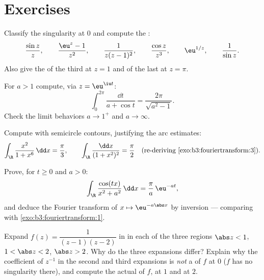 \section{Exercises}

\begin{exercise}[$\star$]\label{exo:b3:residues:1}
Classify the singularity at $0$ and compute the :
\[
\frac{\sin z}{z},\qquad
\frac{\eu^z - 1}{z^2},\qquad
\frac{1}{z(z-1)^2},\qquad
\frac{\cos z}{z^3},\qquad
\eu^{1/z},\qquad
\frac1{\sin z} .
\]
Also give the  of the third at $z = 1$ and of the last
at $z = \pi$.
\end{exercise}

\begin{exercise}[$\star$]\label{exo:b3:residues:2}
For $a > 1$ compute, via $z = \eu^{\iu t}$:
\[
\int_0^{2\pi}\frac{\dd t}{a + \cos t}
= \frac{2\pi}{\sqrt{a^2 - 1}} .
\]
Check the limit behaviors $a \to 1^+$ and $a \to \infty$.
\end{exercise}

\begin{exercise}[$\star\star$]\label{exo:b3:residues:3}
Compute with semicircle contours, justifying the arc estimates:
\[
\int_\R\frac{x^2}{1 + x^6}\,\dd x = \frac\pi3,
\qquad
\int_\R\frac{\dd x}{(1 + x^2)^{2}} = \frac\pi2
\quad\text{(re-deriving \cref{exo:b3:fouriertransform:3})}.
\]
\end{exercise}

\begin{exercise}[$\star\star$]\label{exo:b3:residues:4}
Prove, for $t \geq 0$ and $a > 0$:
\[
\int_\R\frac{\cos(tx)}{x^2 + a^2}\,\dd x =
\frac{\pi}{a}\,\eu^{-at},
\]
and deduce the Fourier transform of $x \mapsto \eu^{-a\abs
x}$ by inversion --- comparing with
\cref{exo:b3:fouriertransform:1}.
\end{exercise}

\begin{exercise}[$\star\star$]\label{exo:b3:residues:5}
Expand $f(z) = \dfrac1{(z-1)(z-2)}$ in  in each
of the three regions $\abs z < 1$, $1 < \abs z < 2$, $\abs z >
2$. Why do the three expansions differ? Explain why the
coefficient of $z^{-1}$ in the second and third expansions is
\emph{not} a  of $f$ at $0$ ($f$ has no singularity
there), and compute the actual  of $f$, at $1$ and at
$2$.
\end{exercise}

